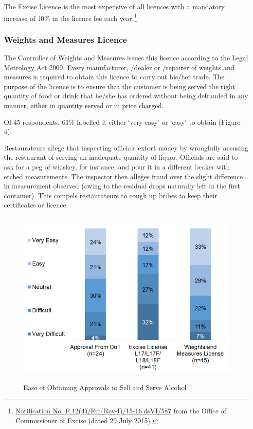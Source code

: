 \documentclass[a4paper, 12pt]{article}
\begin{document}
		The Excise Licence is the most expensive of all licences with a mandatory increase of 10\% in the licence fee each year.\footnote{\href{https://bit.ly/2xoejoG}{Notification No. F.12(4)/Fin(Rev-I)/15-16.dsVI/587} from the Office of Commissioner of Excise 
(dated 29 July 2015).} 
		
		
		\subsubsection{Weights and Measures Licence}
		The Controller of Weights and Measures issues this licence according to the Legal Metrology Act 2009. Every manufacturer, /dealer or /repairer of weights and measures is required to obtain this licence to carry out his/her trade. The purpose of the 
licence is to ensure that the customer is being served the right quantity of food or drink that he/she has ordered without being defrauded in any manner, either in quantity served or in price charged.
		
		Of 45 respondents, 61\% labelled it either ‘very easy’ or ‘easy’ to obtain (Figure 4). %
		
		Restaurateurs allege that inspecting officials extort money by wrongfully accusing the restaurant of serving an inadequate quantity of liquor. Officials are said to ask for a peg of whiskey, for instance, and pour it in a different beaker with etched 
measurements. The inspector then alleges fraud over the slight difference in measurement observed (owing to the residual drops naturally left in the first container). This compels restaurateurs to cough up bribes to keep their certificates or licence.
		
		\begin{figure}[H]
                    	\centering
                    	\includegraphics[height = 3.5in]{Figure4.png}
                    	\caption[Optional Caption]{Ease of Obtaining Approvals to Sell and Serve Alcohol}
		\end{figure}
	
\end{document}
